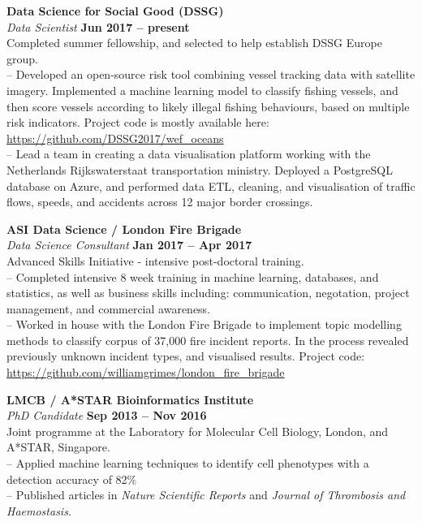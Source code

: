 \documentclass[margin,line]{resume}
\begin{document}
\begin{resume}
    \textbf{\listing Data Science for Social Good (DSSG)} \vspace{2mm}\\\vspace{1mm}%
    \textsl{Data Scientist} \hfill \textbf{Jun 2017 -- present}\\
    Completed summer fellowship, and selected to help establish DSSG Europe group. \\
    -- Developed an open-source risk tool combining vessel tracking data with satellite imagery. Implemented a machine learning model to classify fishing vessels, and then score vessels according to likely illegal fishing behaviours, based on multiple risk indicators. Project code is mostly available here: \url{https://github.com/DSSG2017/wef_oceans} \\
	-- Lead a team in creating a data visualisation platform working with the Netherlands Rijkswaterstaat transportation ministry. Deployed a PostgreSQL database on Azure, and performed data ETL, cleaning, and visualisation of traffic flows, speeds, and accidents across 12 major border crossings.

    \textbf{\listing ASI Data Science / London Fire Brigade} \vspace{2mm}\\\vspace{1mm}%
    \textsl{Data Science Consultant} \hfill \textbf{Jan 2017 -- Apr 2017}\\
    Advanced Skills Initiative - intensive post-doctoral training. \\
    -- Completed intensive 8 week training in machine learning, databases, and statistics, as well as business skills including: communication, negotation, project management, and commercial awareness. \\
    -- Worked in house with the London Fire Brigade to implement topic modelling methods to classify corpus of 37,000 fire incident reports. In the process revealed previously unknown incident types, and visualised results. Project code: \url{https://github.com/williamgrimes/london_fire_brigade}

    \textbf{\listing LMCB / A*STAR Bioinformatics Institute} \vspace{2mm}\\\vspace{1mm}%
    \textsl{PhD Candidate} \hfill \textbf{Sep 2013 -- Nov 2016}\\
	Joint programme at the Laboratory for Molecular Cell Biology, London, and A*STAR, Singapore. \\
	-- Applied machine learning techniques to identify cell phenotypes with a detection accuracy of 82$\%$ \\
	-- Published articles in \emph{Nature Scientific Reports} and \emph{Journal of Thrombosis and Haemostasis}.


\end{resume}
\end{document}
